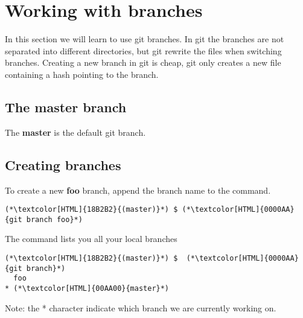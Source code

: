 \section{Working with branches}
\begin{frame}[fragile]
    \slidetitle
In this section we will learn to use git branches.
In git the branches are not separated into different directories, but git rewrite the files when switching branches.
Creating a new branch in git is cheap, git only creates a new file containing a hash pointing to the branch.
\end{frame}

\subsection{The master branch}
\begin{frame}[fragile]
    \subslidetitle
The \textbf{master} is the default git branch.
\end{frame}

\subsection{Creating branches}
\begin{frame}[fragile]
    \subslidetitle

To create a new \textbf{foo} branch, append the branch name to the  command.
\begin{lstlisting}
(*\textcolor[HTML]{18B2B2}{(master)}*) $ (*\textcolor[HTML]{0000AA}{git branch foo}*)
\end{lstlisting}

The  command lists you all your local branches
\begin{lstlisting}
(*\textcolor[HTML]{18B2B2}{(master)}*) $  (*\textcolor[HTML]{0000AA}{git branch}*)
  foo
* (*\textcolor[HTML]{00AA00}{master}*)
\end{lstlisting}

Note: the * character indicate which branch we are currently working on.
\end{frame}


